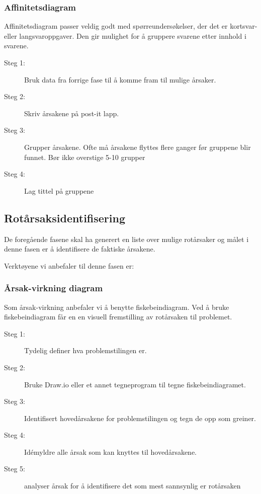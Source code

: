 \subsubsection{Affinitetsdiagram} Affinitetsdiagram passer veldig godt med spørreundersøkelser, der det er kortsvar- eller langsvaroppgaver. Den gir mulighet for å gruppere svarene etter innhold i svarene. 
\begin{description}
    \item[Steg 1:] Bruk data fra forrige fase til å komme fram til mulige årsaker.
    \item[Steg 2:] Skriv årsakene på post-it lapp.
    \item[Steg 3:] Grupper årsakene. Ofte må årsakene flyttes flere ganger før gruppene blir funnet. Bør ikke overstige 5-10 grupper 
    \item[Steg 4:] Lag tittel på gruppene
\end{description}

\subsection{Rotårsaksidentifisering}
De foregående fasene skal ha generert en liste over mulige rotårsaker og målet i denne fasen er å identifisere de faktiske årsakene. 

Verktøyene vi anbefaler til denne fasen er:

    \subsubsection{Årsak-virkning diagram} Som årsak-virkning anbefaler vi å benytte fiskebeindiagram. Ved å bruke fiskebeindiagram får en en visuell fremstilling av rotårsaken til problemet.
    \begin{description}
        \item[Steg 1:] Tydelig definer hva problemstilingen er.
        \item[Steg 2:] Bruke Draw.io eller et annet tegneprogram til tegne fiskebeindiagramet.
        \item[Steg 3:] Identifisert hovedårsakene for problemstilingen og tegn de opp som greiner.
        \item[Steg 4:] Idémyldre alle årsak som kan knyttes til hovedårsakene.
        \item[Steg 5:] analyser årsak for å identifisere det som mest sannsynlig er rotårsaken
    \end{description}
    
